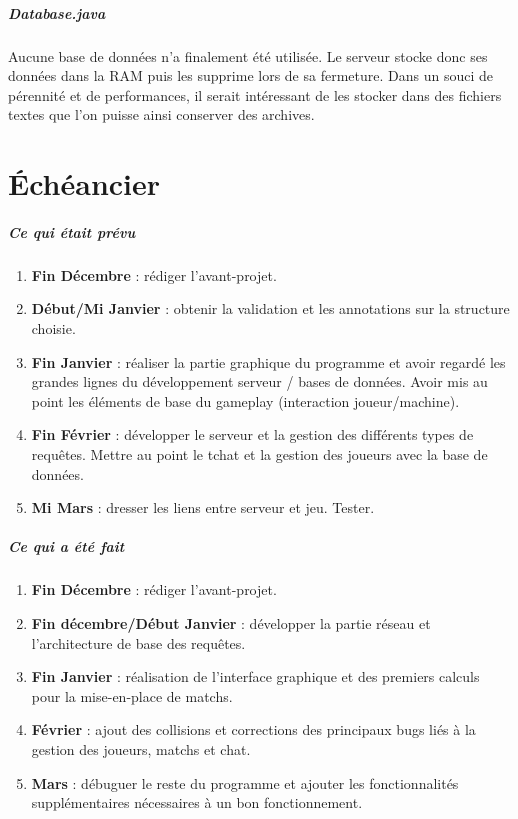 \documentclass[a4paper,12pt]{report}
\begin{document}
\paragraph{Database.java}
Aucune base de données n'a finalement été utilisée. Le serveur stocke donc ses données dans la RAM puis les supprime lors de sa fermeture. Dans un souci de pérennité et de performances, il serait intéressant de les stocker dans des fichiers textes que l'on puisse ainsi conserver des archives.
\chapter{Échéancier}
\paragraph{Ce qui était prévu}
\begin{enumerate}
    \item \textbf{Fin Décembre} : rédiger l'avant-projet.
    \item \textbf{Début/Mi Janvier} : obtenir la validation et les annotations sur la structure choisie.
    \item \textbf{Fin Janvier} : réaliser la partie graphique du programme et avoir regardé les grandes lignes du développement serveur / bases de données. Avoir mis au point les éléments de base du gameplay (interaction joueur/machine).
    \item \textbf{Fin Février} : développer le serveur et la gestion des différents types de requêtes. Mettre au point le tchat et la gestion des joueurs avec la base de données.
    \item \textbf{Mi Mars} : dresser les liens entre serveur et jeu. Tester.
\end{enumerate}
\paragraph{Ce qui a été fait}
\begin{enumerate}
    \item \textbf{Fin Décembre} : rédiger l'avant-projet.
    \item \textbf{Fin décembre/Début Janvier} : développer la partie réseau et l'architecture de base des requêtes.
    \item \textbf{Fin Janvier} : réalisation de l'interface graphique et des premiers calculs pour la mise-en-place de matchs.
    \item \textbf{Février} : ajout des collisions et corrections des principaux bugs liés à la gestion des joueurs, matchs et chat.
    \item \textbf{Mars} : débuguer le reste du programme et ajouter les fonctionnalités supplémentaires nécessaires à un bon fonctionnement.
\end{enumerate}
\end{document}
